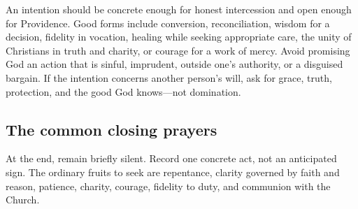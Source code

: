 An intention should be concrete enough for honest intercession and open enough for Providence. Good forms include conversion, reconciliation, wisdom for a decision, fidelity in vocation, healing while seeking appropriate care, the unity of Christians in truth and charity, or courage for a work of mercy. Avoid promising God an action that is sinful, imprudent, outside one's authority, or a disguised bargain. If the intention concerns another person's will, ask for grace, truth, protection, and the good God knows---not domination.

\subsection{The common closing prayers}

\NovenaPaterNoster

\NovenaGloria

At the end, remain briefly silent. Record one concrete act, not an anticipated sign. The ordinary fruits to seek are repentance, clarity governed by faith and reason, patience, charity, courage, fidelity to duty, and communion with the Church.
